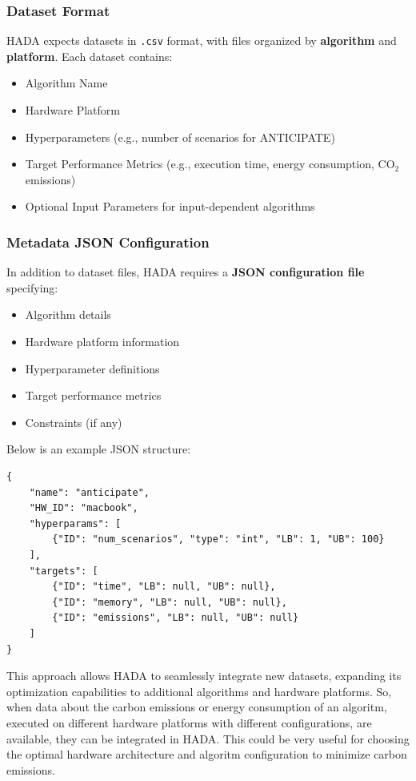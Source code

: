 \documentclass[a4paper,singleside,12pt]{report} %
\begin{document}
\subsubsection{Dataset Format}

HADA expects datasets in \texttt{.csv} format, with files organized by \textbf{algorithm} and \textbf{platform}. Each dataset contains:
\begin{itemize}
    \item Algorithm Name
    \item Hardware Platform
    \item Hyperparameters (e.g., number of scenarios for ANTICIPATE)
    \item Target Performance Metrics (e.g., execution time, energy consumption, CO$_2$ emissions)
    \item Optional Input Parameters for input-dependent algorithms
\end{itemize}

\subsubsection{Metadata JSON Configuration}

In addition to dataset files, HADA requires a \textbf{JSON configuration file} specifying:
\begin{itemize}
    \item Algorithm details
    \item Hardware platform information
    \item Hyperparameter definitions
    \item Target performance metrics
    \item Constraints (if any)
\end{itemize}

Below is an example JSON structure:

\begin{verbatim}
{
    "name": "anticipate",
    "HW_ID": "macbook",
    "hyperparams": [
        {"ID": "num_scenarios", "type": "int", "LB": 1, "UB": 100}
    ],
    "targets": [
        {"ID": "time", "LB": null, "UB": null},
        {"ID": "memory", "LB": null, "UB": null},
        {"ID": "emissions", "LB": null, "UB": null}
    ]
}
\end{verbatim}

This approach allows HADA to seamlessly integrate new datasets, expanding its optimization capabilities to additional algorithms and hardware platforms. So, when data about the carbon
emissions or energy consumption of an algoritm, executed on different hardware platforms with different configurations, are available, they can be integrated in HADA. This could be 
very useful for choosing the optimal hardware architecture and algoritm configuration to minimize carbon emissions.
\end{document}
